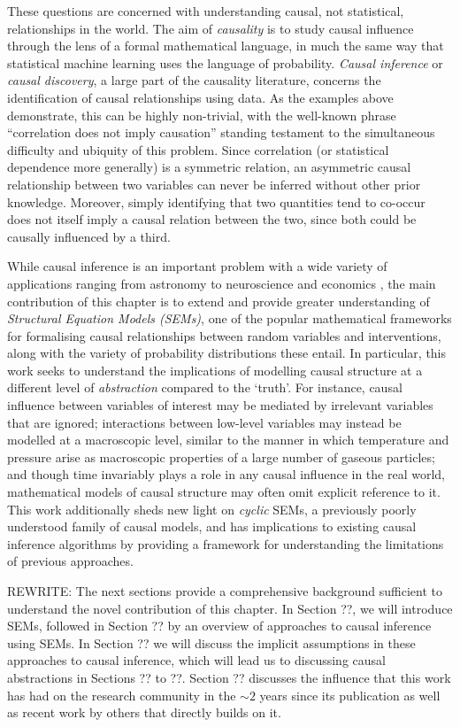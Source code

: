 These questions are concerned with understanding causal, not statistical, relationships in the world. 
The aim of \emph{causality} is to study causal influence through the lens of a formal mathematical language, in much the same way that statistical machine learning uses the language of probability. 
\emph{Causal inference} or \emph{causal discovery}, a large part of the causality literature, concerns the identification of causal relationships using data.
As the examples above demonstrate, this can be highly non-trivial, with the well-known phrase ``correlation does not imply causation'' standing testament to the simultaneous difficulty and ubiquity of this problem.
Since correlation (or statistical dependence more generally) is a symmetric relation, an asymmetric causal relationship between two variables can never be inferred without other prior knowledge. 
Moreover, simply identifying that two quantities tend to co-occur does not itself imply a causal relation between the two, since both could be causally influenced by a third.

While causal inference is an important problem with a wide variety of applications ranging from astronomy to neuroscience and economics \citep{scholkopf2016modeling, ding200617, hicks1980causality}, the main contribution of this chapter is to extend and provide greater understanding of \emph{Structural Equation Models (SEMs)}, one of the popular mathematical frameworks for formalising causal relationships between random variables and interventions, along with the variety of probability distributions these entail. 
In particular, this work seeks to understand the implications of modelling causal structure at a different level of \emph{abstraction} compared to the `truth'. For instance, causal influence between variables of interest may be mediated by irrelevant variables that are ignored; interactions between low-level variables may instead be modelled at a macroscopic level, similar to the manner in which temperature and pressure arise as macroscopic properties of a large number of gaseous particles; and though time invariably plays a role in any causal influence in the real world, mathematical models of causal structure may often omit explicit reference to it.
This work additionally sheds new light on \emph{cyclic} SEMs, a previously poorly understood family of causal models, and has implications to existing causal inference algorithms by providing a framework for understanding the limitations of previous approaches.

REWRITE:
The next sections provide a comprehensive background sufficient to understand the novel contribution of this chapter.
In Section ??, we will introduce SEMs, followed in Section ?? by an overview of approaches to causal inference using SEMs. 
In Section ?? we will discuss the implicit assumptions in these approaches to causal inference, which will lead us to discussing causal abstractions in Sections ?? to ??.
Section ?? discusses the influence that this work has had on the research community in the $\sim 2$ years since its publication as well as recent work by others that directly builds on it.

